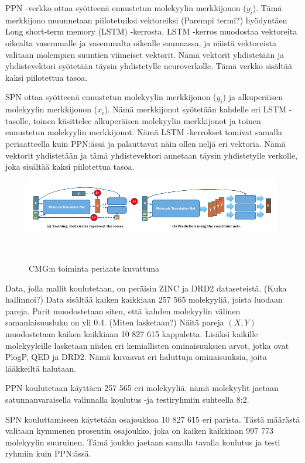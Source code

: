 \documentclass[finnish,twoside,censored,tkt,sw-line]{HYthesisML}
\begin{document}
PPN -verkko ottaa syötteenä ennustetun molekyylin merkkijonon (\(y_i\)).
Tämä merkkijono muunnetaan piilotetuiksi vektoreiksi (Parempi termi?) hyödyntäen Long short-term memory (LSTM) -kerrosta.
LSTM -kerros muodostaa vektoreita oikealta vasemmalle ja vasemmalta oikealle suunnassa, ja näistä vektoreista valitaan molempien suuntien viimeiset vektorit.
Nämä vektorit yhdistetään ja yhdistevektori syötetään täysin yhdistetylle neuroverkolle.
Tämä verkko sisältää kaksi piilotettua tasoa.

SPN ottaa syötteenä ennustetun molekyylin merkkijonon (\(y_i\)) ja alkuperäisen molekyylin merkkijonon (\(x_i\)).
Nämä merkkijonot syötetään kahdelle eri LSTM -tasolle, toinen käsittelee alkuperäisen molekyylin merkkijonot ja toinen ennustetun molekyylin merkkijonot.
Nämä LSTM -kerrokset tomivat samalla periaatteella kuin PPN:ässä ja palauttavat näin ollen neljä eri vektoria.
Nämä vektorit yhdistetään ja tämä yhdistevektori annetaan täysin yhdistetylle verkolle, joka sisältää kaksi piilotettua tasoa.

\begin{figure}
    \centering
    \includegraphics[width=\textwidth]{CMG-fig.png}
    \caption{CMG:n toiminta periaate kuvattuna}
    {~\cite{ShinBonggun}}
\end{figure}

Data, jolla mallit koulutetaan, on peräisin ZINC ja DRD2 dataseteistä. (Kuka hallinnoi?)
Data sisältää kaiken kaikkiaan 257 565 molekyyliä, joista luodaan pareja.
Parit muodostetaan siten, että kahden molekyylin välinen samanlaisuusluku on yli 0.4. (Miten lasketaan?)
Näitä pareja \((X,Y)\) muodostetaan kaiken kaikkiaan 10 827 615 kappaletta.
Lisäksi kaikille molekyyleille lasketaan niiden eri kemiallisten ominaisuuksien arvot, jotka ovat PlogP, QED ja DRD2.
Nämä kuvaavat eri haluttuja ominaisuuksia, joita lääkkeiltä halutaan.

PPN koulutetaan käyttäen 257 565 eri molekyyliä.
nämä molekyylit jaetaan satunnanvaraisella valinnalla koulutus -ja testiryhmiin suhteella 8:2.

SPN kouluttamiseen käytetään osajoukkoa 10 827 615 eri parista.
Tästä määrästä valitaan kymmenen prosentin osajoukko, joka on kaiken kaikkiaan 997 773 molekyylin suuruinen.
Tämä joukko jaetaan samalla tavalla koulutus ja testi ryhmiin kuin PPN:ässä.
\end{document}
